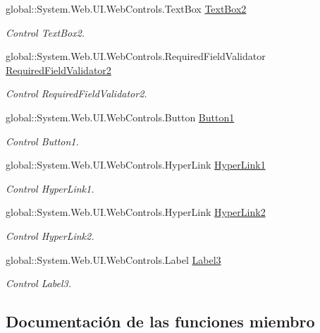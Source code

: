 \begin{DoxyCompactItemize}
global\+::\+System.\+Web.\+U\+I.\+Web\+Controls.\+Text\+Box \mbox{\hyperlink{classInicio_1_1Login_ac99495a6fbd78cbf118b7c058815e9f2}{Text\+Box2}}
\begin{DoxyCompactList}\small\item\em Control Text\+Box2. \end{DoxyCompactList}\item 
global\+::\+System.\+Web.\+U\+I.\+Web\+Controls.\+Required\+Field\+Validator \mbox{\hyperlink{classInicio_1_1Login_a072466936abf9e49afe63fb3874ddee6}{Required\+Field\+Validator2}}
\begin{DoxyCompactList}\small\item\em Control Required\+Field\+Validator2. \end{DoxyCompactList}\item 
global\+::\+System.\+Web.\+U\+I.\+Web\+Controls.\+Button \mbox{\hyperlink{classInicio_1_1Login_a538759688d96a18839d8cf330a38b4e0}{Button1}}
\begin{DoxyCompactList}\small\item\em Control Button1. \end{DoxyCompactList}\item 
global\+::\+System.\+Web.\+U\+I.\+Web\+Controls.\+Hyper\+Link \mbox{\hyperlink{classInicio_1_1Login_a3370ab8441b3a73d003560dcbcaff0d9}{Hyper\+Link1}}
\begin{DoxyCompactList}\small\item\em Control Hyper\+Link1. \end{DoxyCompactList}\item 
global\+::\+System.\+Web.\+U\+I.\+Web\+Controls.\+Hyper\+Link \mbox{\hyperlink{classInicio_1_1Login_a51395541b60da1b91a7cbbd240b4c0f3}{Hyper\+Link2}}
\begin{DoxyCompactList}\small\item\em Control Hyper\+Link2. \end{DoxyCompactList}\item 
global\+::\+System.\+Web.\+U\+I.\+Web\+Controls.\+Label \mbox{\hyperlink{classInicio_1_1Login_ad052535d49bad44248dd771596f4a8af}{Label3}}
\begin{DoxyCompactList}\small\item\em Control Label3. \end{DoxyCompactList}\end{DoxyCompactItemize}


\subsection{Documentación de las funciones miembro}
\mbox{\label{classInicio_1_1Login_a4c72ae6605baac8dff22e547df892ba1}} 

